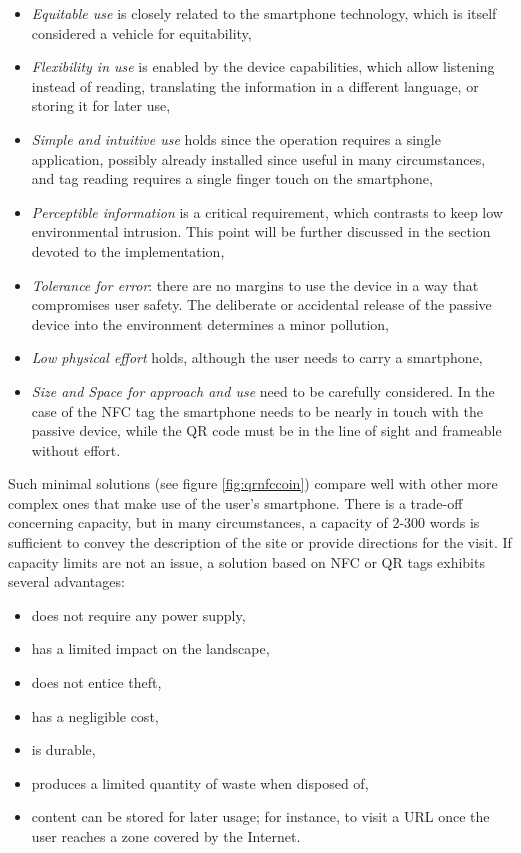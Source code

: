 \documentclass[sustainability,article,submit,pdftex,moreauthors]{Definitions/mdpi}
\begin{document}
\begin{itemize}
	\item {\em Equitable use} is closely related to the smartphone technology, which is itself considered a vehicle for equitability,
	\item {\em Flexibility in use} is enabled by the device capabilities, which allow listening instead of reading, translating the information in a different language, or storing it for later use,
	\item {\em Simple and intuitive use} holds since the operation requires a single application, possibly already installed since useful in many circumstances, and tag reading requires a single finger touch on the smartphone,
	\item{\em Perceptible information} is a critical requirement, which contrasts to keep low environmental intrusion. This point will be further discussed in the section devoted to the implementation,
	\item{\em Tolerance for error}: there are no margins to use the device in a way that compromises user safety. The deliberate or accidental release of the passive device into the environment determines a minor pollution,
	\item{\em Low physical effort} holds, although the user needs to carry a smartphone,
	\item{\em Size and Space for approach and use} need to be carefully considered. In the case of the NFC tag the smartphone needs to be nearly in touch with the passive device, while the QR code must be in the line of sight and frameable without effort.
\end{itemize}

Such minimal solutions (see figure \ref{fig:qrnfccoin}) compare well with other more complex ones that make use of the user's smartphone. There is a trade-off concerning capacity, but in many circumstances, a capacity of 2-300 words is sufficient to convey the description of the site or provide directions for the visit. If capacity limits are not an issue, a solution based on NFC or QR tags exhibits several advantages:

\begin{itemize} 
\item does not require any power supply,
\item has a limited impact on the landscape,
\item does not entice theft,
\item has a negligible cost,
\item is durable,
\item produces a limited quantity of waste when disposed of,
\item content can be stored for later usage; for instance, to visit a URL once the user reaches a zone covered by the Internet.
\end{itemize}
\end{document}
